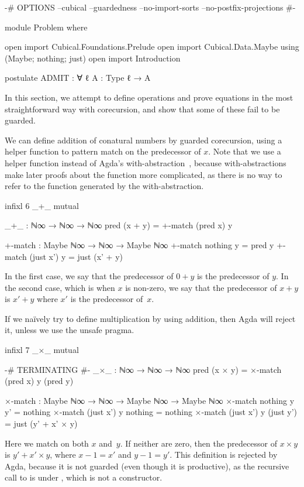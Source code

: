 \begin{code}[hide]
{-# OPTIONS --cubical --guardedness --no-import-sorts --no-postfix-projections #-}

module Problem where

open import Cubical.Foundations.Prelude
open import Cubical.Data.Maybe using (Maybe; nothing; just)
open import Introduction

postulate
  ADMIT : ∀ {ℓ} {A : Type ℓ} → A
\end{code}
In this section, we attempt to define operations and prove equations in the most
straightforward way with corecursion, and show that some of these fail to be
guarded.

We can define addition of conatural numbers by guarded corecursion, using a
helper function  to pattern match on the predecessor of
$x$. Note that we use a helper function instead of Agda's
with-abstraction~\cite{norell-agda}, because with-abstractions make later proofs
about the function more complicated, as there is no way to refer to the function
generated by the with-abstraction.
\begin{code}[hide]
infixl 6 _+_
mutual
\end{code}
\begin{code}
  _+_ : ℕ∞ → ℕ∞ → ℕ∞
  pred (x + y) = +-match (pred x) y

  +-match : Maybe ℕ∞ → ℕ∞ → Maybe ℕ∞
  +-match nothing    y = pred y
  +-match (just x')  y = just (x' + y)
\end{code}
In the first case, we say that the predecessor of $0 + y$ is the predecessor of
$y$. In the second case, which is when $x$ is non-zero, we say that the
predecessor of $x + y$ is $x' + y$ where $x'$ is the predecessor of~$x$.

If we naïvely try to define multiplication by using addition, then Agda will
reject it, unless we use the unsafe  pragma.
\begin{code}[hide]
infixl 7 _×_
mutual
\end{code}
\begin{code}
  {-# TERMINATING #-}
  _×_ : ℕ∞ → ℕ∞ → ℕ∞
  pred (x × y) = ×-match (pred x) y (pred y)

  ×-match :
    Maybe ℕ∞ → ℕ∞ → Maybe ℕ∞ → Maybe ℕ∞
  ×-match nothing    y y'         = nothing
  ×-match (just x')  y nothing    = nothing
  ×-match (just x')  y (just y')  = just (y' + x' × y)
\end{code}
Here we match on both $x$ and~$y$. If neither are zero, then the predecessor of
$x × y$ is $y' + x' × y$, where $x - 1 = x'$ and $y - 1 = y'$. This definition
is rejected by Agda, because it is not guarded (even though it is productive),
as the recursive call to  is under \AgdaFunction{\_+\_},
which is not a constructor.

